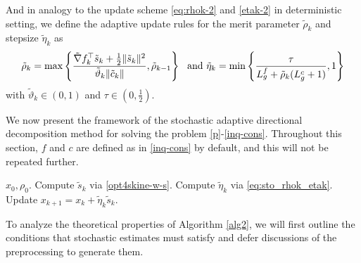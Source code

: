 \documentclass[11pt]{article}
\newcommand{\be}{\begin{equation}}
\begin{document}
And in analogy to the update scheme \eqref{eq:rhok-2} and \eqref{etak-2}  in deterministic setting, we define the adaptive update rules for the merit parameter \(\tilde{\rho}_k\) and stepsize \(\tilde{\eta}_k\)  as
\begin{align}\label{eq:sto_rhok_etak}
    \tilde \rho_k = \max \left\{ \frac{\tilde \nabla f_k^\top \tilde s_k + \frac{1}{2}\|\tilde s_k\|^2}{\tilde \vartheta_k \|\tilde c_k\|}, \tilde \rho_{k-1} \right\}~~{\rm and}~\tilde \eta_k = \min \left\{\frac{\tau}{L_g^f + \tilde \rho_k (L_g^c+1)}, 1\right\}
\end{align}
with $\tilde \vartheta_k\in(0,1)$ and $\tau \in (0,\frac{1}{2})$. 

We now present the framework of the stochastic adaptive directional decomposition method for solving the problem \eqref{p}-\eqref{inq-cons}. Throughout this section, \(f\)
 and \(c\) are defined as in \eqref{inq-cons} by default, and this will not be repeated further.  

\begin{algorithm}[H]
  \caption{Stochastic adaptive directional decomposition method for \eqref{p}-\eqref{inq-cons}} 
  \label{alg2}
  \begin{algorithmic}[1] 
    \REQUIRE \(x_0, \rho_0\).
    \STATE Compute \(\tilde s_k\) via \eqref{opt4skine-w-s}.%
        \STATE Compute \(\tilde \eta_k\) via \eqref{eq:sto_rhok_etak}.
        \STATE Update \(x_{k+1} = x_k + \tilde \eta_k \tilde s_k\).
    \ENDFOR 
  \end{algorithmic} 
\end{algorithm}

To analyze the theoretical properties of Algorithm \ref{alg2}, we will first outline the conditions that  stochastic estimates  must satisfy and  defer discussions of the preprocessing to generate them.





\end{document}

